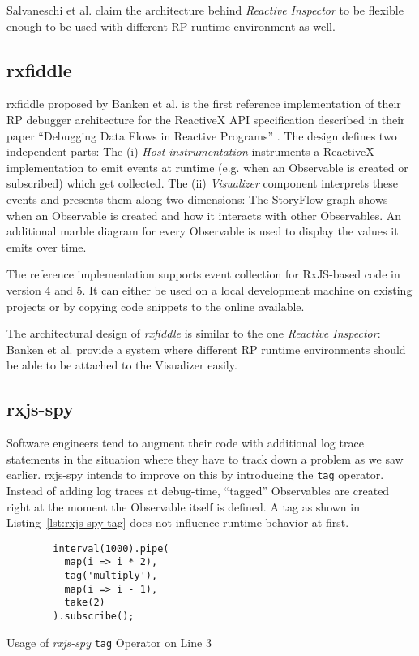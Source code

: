 \documentclass[12pt,a4paper]{article}
\begin{document}
Salvaneschi et al. claim\cite{10.1145/2577080.2577083} the architecture behind \emph{Reactive Inspector} to be flexible enough to be used with different RP runtime environment as well.

\subsection{rxfiddle}

rxfiddle proposed by Banken et al. is the first reference implementation of their RP debugger architecture for the ReactiveX API specification described in their paper ``Debugging Data Flows in Reactive Programs'' \cite{10.1145/3180155.3180156}. The design defines two independent parts: The (i) \emph{Host instrumentation} instruments a ReactiveX implementation to emit events at runtime (e.g. when an Observable is created or subscribed) which get collected. The (ii) \emph{Visualizer} component interprets these events and presents them along two dimensions: The StoryFlow graph \cite{YWu2013a} shows when an Observable is created and how it interacts with other Observables. An additional marble diagram for every Observable is used to display the values it emits over time.

The reference implementation supports event collection for RxJS-based code in version 4 and 5. It can either be used on a local development machine on existing projects or by copying code snippets to the online available.

The architectural design of \emph{rxfiddle} is similar to the one \emph{Reactive Inspector}: Banken et al. provide a system where different RP runtime environments should be able to be attached to the Visualizer easily.


\subsection{rxjs-spy}

Software engineers tend to augment their code with additional log trace statements in the situation where they have to track down a problem as we saw earlier. rxjs-spy\cite{rxjsspy} intends to improve on this by introducing the \texttt{tag} operator. Instead of adding log traces at debug-time, ``tagged'' Observables are created right at the moment the Observable itself is defined. A tag as shown in Listing~\ref{lst:rxjs-spy-tag} does not influence runtime behavior at first.

\begin{listing}[H]
	\begin{verbatim}
		interval(1000).pipe(
		  map(i => i * 2),
		  tag('multiply'),
		  map(i => i - 1),
		  take(2)
		).subscribe();
	\end{verbatim}
	\caption{Usage of \emph{rxjs-spy} \texttt{tag} Operator on Line 3}
	\label{lst:rxjs-spy-tag}
\end{listing}
\end{document}
